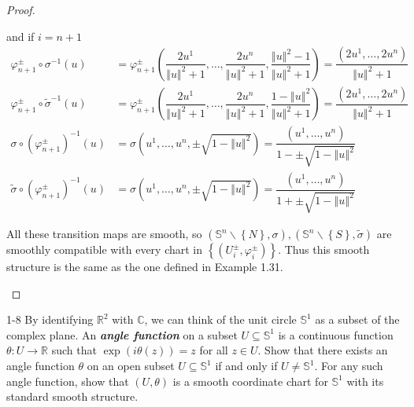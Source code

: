 \begin{proof}
\begin{enumerate}[itemsep=0pt,label={(\alph*)}]
              and if \( i = n + 1 \)
              \begingroup
              \allowdisplaybreaks%
              \begin{align*}
                  \varphi_{n+1}^{\pm} \circ \sigma^{-1}(u)                 & = \varphi_{n+1}^{\pm} \left( \dfrac{2 u^{1}}{{\left\Vert u \right\Vert}^{2} + 1}, \ldots, \dfrac{2 u^{n}}{{\left\Vert u \right\Vert}^{2} + 1}, \dfrac{{\left\Vert u \right\Vert}^{2} - 1}{{\left\Vert u \right\Vert}^{2} + 1} \right) = \dfrac{(2 u^{1}, \ldots, 2 u^{n})}{{\left\Vert u \right\Vert}^{2} + 1} \\
                  \varphi_{n+1}^{\pm} \circ \widetilde{\sigma}^{-1}(u)     & = \varphi_{n+1}^{\pm} \left( \dfrac{2 u^{1}}{{\left\Vert u \right\Vert}^{2} + 1}, \ldots, \dfrac{2 u^{n}}{{\left\Vert u \right\Vert}^{2} + 1}, \dfrac{1 - {\left\Vert u \right\Vert}^{2}}{{\left\Vert u \right\Vert}^{2} + 1} \right) = \dfrac{(2 u^{1}, \ldots, 2 u^{n})}{{\left\Vert u \right\Vert}^{2} + 1} \\
                  \sigma \circ {(\varphi_{n+1}^{\pm})}^{-1}(u)             & = \sigma\left(u^{1}, \ldots, u^{n}, \pm\sqrt{1 - {\left\Vert u \right\Vert}^{2}}\right) = \dfrac{(u^{1}, \ldots, u^{n})}{1 - \pm\sqrt{1 - {\left\Vert u \right\Vert}^{2}}}                                                                                                                                     \\
                  \widetilde{\sigma} \circ {(\varphi_{n+1}^{\pm})}^{-1}(u) & = \sigma\left(u^{1}, \ldots, u^{n}, \pm\sqrt{1 - {\left\Vert u \right\Vert}^{2}}\right) = \dfrac{(u^{1}, \ldots, u^{n})}{1 + \pm\sqrt{1 - {\left\Vert u \right\Vert}^{2}}}
              \end{align*}
              \endgroup

              All these transition maps are smooth, so \( (\mathbb{S}^{n} \smallsetminus \left\{ N \right\}, \sigma), (\mathbb{S}^{n} \smallsetminus \left\{ S \right\}, \widetilde{\sigma}) \) are smoothly compatible with every chart in \( {\left\{ (U_{i}^{\pm}, \varphi_{i}^{\pm}) \right\}} \). Thus this smooth structure is the same as the one defined in Example 1.31.
    \end{enumerate}
\end{proof}

\begin{problem}{1-8}
    By identifying \( \mathbb{R}^{2} \) with \( \mathbb{C} \), we can think of the unit circle \( \mathbb{S}^{1} \) as a subset of the complex plane. An \textbf{\emph{angle function}} on a subset \( U \subseteq \mathbb{S}^{1} \) is a continuous function \( \theta: U \to \mathbb{R} \) such that \( \exp(i \theta(z)) = z \) for all \( z \in U \). Show that there exists an angle function \( \theta \) on an open subset \( U \subseteq \mathbb{S}^{1} \) if and only if \( U \ne \mathbb{S}^{1} \). For any such angle function, show that \( (U, \theta) \) is a smooth coordinate chart for \( \mathbb{S}^{1} \) with its standard smooth structure.
\end{problem}

